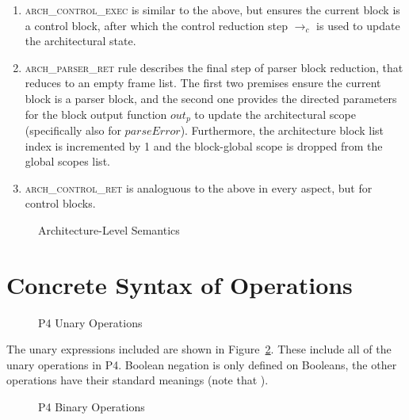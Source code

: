 \documentclass[UTF8]{article}
\begin{document}
\begin{enumerate}
\item \textsc{arch\_control\_exec} is similar to the above, but ensures the current block is a control block, after which the control reduction step $\longrightarrow_c$ is used to update the architectural state.

\item \textsc{arch\_parser\_ret} rule describes the final step of parser block reduction, that reduces to an empty frame list. The first two premises ensure the current block is a parser block, and the second one provides the directed parameters for the block output function $\mathit{out}_{ \mathit{p} }$ to update the architectural scope (specifically also for $\mathit{parseError}$). Furthermore, the architecture block list index is incremented by 1 and the block-global scope is dropped from the global scopes list.

\item \textsc{arch\_control\_ret} is analoguous to the above in every aspect, but for control blocks.
\end{enumerate}

\begin{figure}[ht!]
\resizebox{.75\linewidth}{!}{
\begin{minipage}{\linewidth}
\ottdefnsarchXXsem
\end{minipage}
}
\caption{Architecture-Level Semantics}
\label{fig:semarch}
\end{figure}


\clearpage
\appendix
\section{Concrete Syntax of Operations}
\label{app:op}
\begin{figure}[ht!]
\centering\ottgrammartabular{
\ottunop\ottafterlastrule
}
\caption{P4 Unary Operations}
\label{fig:unop}
\end{figure}

The unary expressions included are shown in Figure~\ref{fig:unop}. These include all of the unary operations in P4. Boolean negation is only defined on Booleans, the other operations have their standard meanings (note that ).

\newpage
\begin{figure}[ht!]
\centering\ottgrammartabular{
\ottbinop\ottafterlastrule
}
\caption{P4 Binary Operations}
\label{fig:binop}
\end{figure}
\end{document}
